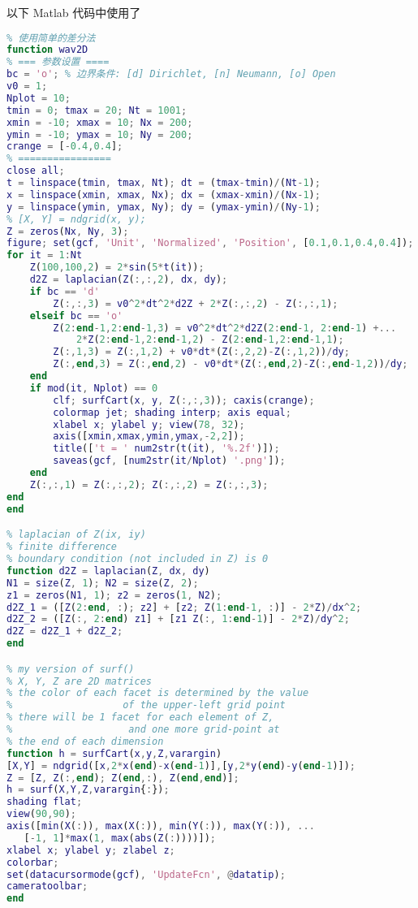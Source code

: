 以下 Matlab 代码中使用了 
\begin{lstlisting}[language=matlab, caption=wav2D.m]
% 二维波动方程的简单数值解
% 使用简单的差分法
function wav2D
% === 参数设置 ====
bc = 'o'; % 边界条件: [d] Dirichlet, [n] Neumann, [o] Open
v0 = 1;
Nplot = 10;
tmin = 0; tmax = 20; Nt = 1001;
xmin = -10; xmax = 10; Nx = 200;
ymin = -10; ymax = 10; Ny = 200;
crange = [-0.4,0.4];
% ================
close all;
t = linspace(tmin, tmax, Nt); dt = (tmax-tmin)/(Nt-1);
x = linspace(xmin, xmax, Nx); dx = (xmax-xmin)/(Nx-1);
y = linspace(ymin, ymax, Ny); dy = (ymax-ymin)/(Ny-1);
% [X, Y] = ndgrid(x, y);
Z = zeros(Nx, Ny, 3);
figure; set(gcf, 'Unit', 'Normalized', 'Position', [0.1,0.1,0.4,0.4]);
for it = 1:Nt
    Z(100,100,2) = 2*sin(5*t(it));
    d2Z = laplacian(Z(:,:,2), dx, dy);
    if bc == 'd'
        Z(:,:,3) = v0^2*dt^2*d2Z + 2*Z(:,:,2) - Z(:,:,1);
    elseif bc == 'o'
        Z(2:end-1,2:end-1,3) = v0^2*dt^2*d2Z(2:end-1, 2:end-1) +...
            2*Z(2:end-1,2:end-1,2) - Z(2:end-1,2:end-1,1);
        Z(:,1,3) = Z(:,1,2) + v0*dt*(Z(:,2,2)-Z(:,1,2))/dy;
        Z(:,end,3) = Z(:,end,2) - v0*dt*(Z(:,end,2)-Z(:,end-1,2))/dy;
    end
    if mod(it, Nplot) == 0
        clf; surfCart(x, y, Z(:,:,3)); caxis(crange);
        colormap jet; shading interp; axis equal;
        xlabel x; ylabel y; view(78, 32);
        axis([xmin,xmax,ymin,ymax,-2,2]);
        title(['t = ' num2str(t(it), '%.2f')]);
        saveas(gcf, [num2str(it/Nplot) '.png']);
    end
    Z(:,:,1) = Z(:,:,2); Z(:,:,2) = Z(:,:,3);
end
end

% laplacian of Z(ix, iy)
% finite difference
% boundary condition (not included in Z) is 0
function d2Z = laplacian(Z, dx, dy)
N1 = size(Z, 1); N2 = size(Z, 2);
z1 = zeros(N1, 1); z2 = zeros(1, N2);
d2Z_1 = ([Z(2:end, :); z2] + [z2; Z(1:end-1, :)] - 2*Z)/dx^2;
d2Z_2 = ([Z(:, 2:end) z1] + [z1 Z(:, 1:end-1)] - 2*Z)/dy^2;
d2Z = d2Z_1 + d2Z_2;
end

% my version of surf()
% X, Y, Z are 2D matrices
% the color of each facet is determined by the value
%                   of the upper-left grid point
% there will be 1 facet for each element of Z,
%                    and one more grid-point at
% the end of each dimension
function h = surfCart(x,y,Z,varargin)
[X,Y] = ndgrid([x,2*x(end)-x(end-1)],[y,2*y(end)-y(end-1)]);
Z = [Z, Z(:,end); Z(end,:), Z(end,end)];
h = surf(X,Y,Z,varargin{:});
shading flat;
view(90,90);
axis([min(X(:)), max(X(:)), min(Y(:)), max(Y(:)), ...
   [-1, 1]*max(1, max(abs(Z(:))))]);
xlabel x; ylabel y; zlabel z;
colorbar;
set(datacursormode(gcf), 'UpdateFcn', @datatip);
cameratoolbar;
end
\end{lstlisting}
